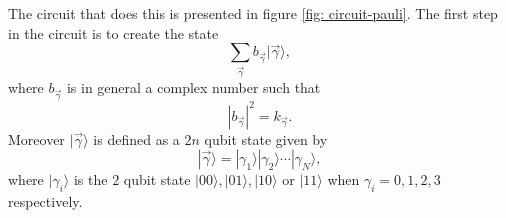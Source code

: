 The circuit that does this is presented in figure 
\ref{fig: circuit-pauli}. 
The first step in the circuit is to create the state
\begin{equation}
\label{ec: state}
\sum_{\vec{\gamma}} b_{\vec{\gamma}} |\vec{\gamma} \rangle,
\end{equation}
where $b_{\vec{\gamma}}$ is in general a complex number such that 
\begin{equation}
|b_{\vec{\gamma}}|^2 = k_{\vec{\gamma}}.
\end{equation}
Moreover $|\vec{\gamma}\rangle$ is defined as a $2n$ qubit state given by
\begin{equation}
|\vec{\gamma} \rangle = |\gamma_1\rangle |\gamma_2 \rangle \cdots |\gamma_N \rangle,
\end{equation}
where $|\gamma_i \rangle$ is the $2$ qubit state $|00\rangle, |01\rangle , |10\rangle$ or $|11\rangle$ when $\gamma_i = 0,1,2,3$ respectively. \\

